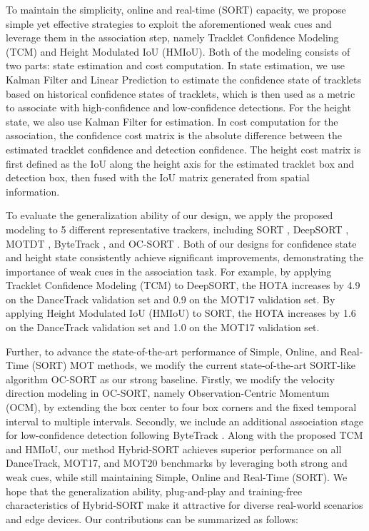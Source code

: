 \documentclass[letterpaper]{article} \usepackage{aaai23}  \usepackage{times}  \usepackage{helvet}  \usepackage{courier}  \usepackage[hyphens]{url}  \usepackage{graphicx} \urlstyle{rm} \def\UrlFont{\rm}  \usepackage{natbib}  \usepackage{caption} \frenchspacing  \setlength{\pdfpagewidth}{8.5in}  \setlength{\pdfpageheight}{11in}  \usepackage{algorithm}
\begin{document}
To maintain the simplicity, online and real-time (SORT) capacity, we propose simple yet effective strategies to exploit the aforementioned weak cues and leverage them in the association step, namely Tracklet Confidence Modeling (TCM) and Height Modulated IoU (HMIoU). Both of the modeling consists of two parts: state estimation and cost computation. In state estimation, we use Kalman Filter and Linear Prediction to estimate the confidence state of tracklets based on historical confidence states of tracklets, which is then used as a metric to associate with high-confidence and low-confidence detections. For the height state, we also use Kalman Filter for estimation. In cost computation for the association, the confidence cost matrix is the absolute difference between the estimated tracklet confidence and detection confidence. The height cost matrix is first defined as the IoU along the height axis for the estimated tracklet box and detection box, then fused with the IoU matrix generated from spatial information.

To evaluate the generalization ability of our design, we apply the proposed modeling to 5 different representative trackers, including SORT \textcolor{blue}{\cite{bewley2016simple}}, DeepSORT \textcolor{blue}{\cite{wojke2017simple}}, MOTDT \textcolor{blue}{\cite{chen2018real}}, ByteTrack \textcolor{blue}{\cite{zhang2022bytetrack}}, and OC-SORT \textcolor{blue}{\cite{cao2023observation}}. Both of our designs for confidence state and height state consistently achieve significant improvements, demonstrating the importance of weak cues in the association task. For example, by applying Tracklet Confidence Modeling (TCM) to DeepSORT, the HOTA increases by 4.9 on the DanceTrack validation
set and 0.9 on the MOT17 validation set. By applying Height Modulated IoU (HMIoU) to SORT, the HOTA increases by 1.6 on the DanceTrack validation set and 1.0 on
the MOT17 validation set. 

Further, to advance the state-of-the-art performance of Simple, Online, and Real-Time (SORT) MOT methods, we modify the current state-of-the-art SORT-like algorithm OC-SORT \textcolor{blue}{\cite{cao2023observation}} as our strong baseline. Firstly, we modify the velocity direction modeling in OC-SORT, namely Observation-Centric Momentum (OCM), by extending the box center to four box corners and the fixed temporal interval to multiple intervals. Secondly, we include an additional association stage for low-confidence detection following ByteTrack \textcolor{blue}{\cite{zhang2022bytetrack}}. Along with the proposed TCM and HMIoU, our method Hybrid-SORT achieves superior performance on all DanceTrack, MOT17, and MOT20 benchmarks by leveraging both strong and weak cues, while still maintaining Simple, Online and Real-Time (SORT). We hope that the generalization ability, plug-and-play and training-free characteristics of Hybrid-SORT make it attractive for diverse real-world scenarios and edge devices. Our contributions can be summarized as follows:
\end{document}
